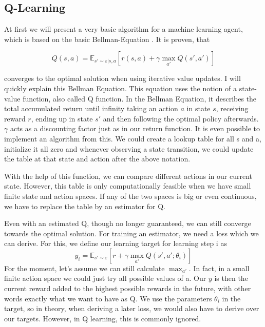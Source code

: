\documentclass[hyperref,german,beleg]{cgvpub}
\begin{document}
\subsection{Q-Learning}

At first we will present a very basic algorithm for a machine learning agent, which is based on the basic Bellman-Equation \cite{bellmanTheoryDynamicProgramming1954}. It is proven, that

\begin{equation}
Q(s, a) = \mathbb{E}_{s' \sim \varepsilon | s,a}[r(s,a) + \gamma\max_{a'}Q(s', a')]
\end{equation}

converges to the optimal solution when using iterative value updates. I will quickly explain this Bellman Equation. This equation uses the notion of a state-value function, also called Q function. In the Bellman Equation, it describes the total accumulated return until infinity taking an action $a$ in state $s$, receiving reward $r$, ending up in state $s'$ and then following the optimal policy afterwards. $\gamma$ acts as a discounting factor just as in our return function. It is even possible to implement an algorithm from this. We could create a lookup table for all s and a, initialize it all zero and whenever observing a state transition, we could update the table at that state and action after the above notation.

With the help of this function, we can compare different actions in our current state. However, this table is only computationally feasible when we have small finite state and action spaces. If any of the two spaces is big or even continuous, we have to replace the table by an estimator for Q.

Even with an estimated Q, though no longer guaranteed, we can still converge towards the optimal solution. For training an estimator, we need a loss which we can derive. For this, we define our learning target for learning step i as
\begin{equation}
y_i = \mathbb{E}_{s' \sim \varepsilon}[r + \gamma \max_{a'}Q(s', a';\theta_{i})]
\end{equation}
For the moment, let's assume we can still calculate $\max_{a'}$. In fact, in a small finite action space we could just try all possible values of a. Our $y$ is then the current reward added to the highest possible rewards in the future, with other words exactly what we want to have as Q. We use the parameters $\theta_{i}$ in the target, so in theory, when deriving a later loss, we would also have to derive over our targets. However, in Q learning, this is commonly ignored.
\end{document}
